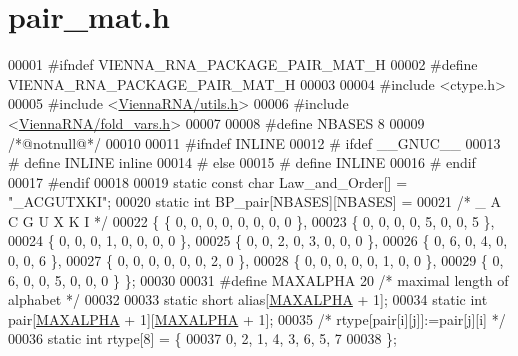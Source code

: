 \hypertarget{pair__mat_8h_source}{}\section{pair\+\_\+mat.\+h}
\label{pair__mat_8h_source}

\begin{DoxyCode}
00001 \textcolor{preprocessor}{#ifndef VIENNA\_RNA\_PACKAGE\_PAIR\_MAT\_H}
00002 \textcolor{preprocessor}{#define VIENNA\_RNA\_PACKAGE\_PAIR\_MAT\_H}
00003 
00004 \textcolor{preprocessor}{#include <ctype.h>}
00005 \textcolor{preprocessor}{#include <\hyperlink{utils_8h}{ViennaRNA/utils.h}>}
00006 \textcolor{preprocessor}{#include <\hyperlink{fold__vars_8h}{ViennaRNA/fold\_vars.h}>}
00007 
00008 \textcolor{preprocessor}{#define NBASES 8}
00009 \textcolor{comment}{/*@notnull@*/}
00010 
00011 \textcolor{preprocessor}{#ifndef INLINE}
00012 \textcolor{preprocessor}{# ifdef \_\_GNUC\_\_}
00013 \textcolor{preprocessor}{#  define INLINE inline}
00014 \textcolor{preprocessor}{# else}
00015 \textcolor{preprocessor}{#  define INLINE}
00016 \textcolor{preprocessor}{# endif}
00017 \textcolor{preprocessor}{#endif}
00018 
00019 \textcolor{keyword}{static} \textcolor{keyword}{const} \textcolor{keywordtype}{char} Law\_and\_Order[]         = \textcolor{stringliteral}{"\_ACGUTXKI"};
00020 \textcolor{keyword}{static} \textcolor{keywordtype}{int}        BP\_pair[NBASES][NBASES] =
00021   \textcolor{comment}{/* \_  A  C  G  U  X  K  I */}
00022 \{ \{ 0, 0, 0, 0, 0, 0, 0, 0 \},
00023   \{ 0, 0, 0, 0, 5, 0, 0, 5 \},
00024   \{ 0, 0, 0, 1, 0, 0, 0, 0 \},
00025   \{ 0, 0, 2, 0, 3, 0, 0, 0 \},
00026   \{ 0, 6, 0, 4, 0, 0, 0, 6 \},
00027   \{ 0, 0, 0, 0, 0, 0, 2, 0 \},
00028   \{ 0, 0, 0, 0, 0, 1, 0, 0 \},
00029   \{ 0, 6, 0, 0, 5, 0, 0, 0 \} \};
00030 
00031 \textcolor{preprocessor}{#define MAXALPHA 20       }\textcolor{comment}{/* maximal length of alphabet */}\textcolor{preprocessor}{}
00032 
00033 \textcolor{keyword}{static} \textcolor{keywordtype}{short}  alias[\hyperlink{group__model__details_ga05a5ffe718aa431d97419a12fb082379}{MAXALPHA} + 1];
00034 \textcolor{keyword}{static} \textcolor{keywordtype}{int}    pair[\hyperlink{group__model__details_ga05a5ffe718aa431d97419a12fb082379}{MAXALPHA} + 1][\hyperlink{group__model__details_ga05a5ffe718aa431d97419a12fb082379}{MAXALPHA} + 1];
00035 \textcolor{comment}{/* rtype[pair[i][j]]:=pair[j][i] */}
00036 \textcolor{keyword}{static} \textcolor{keywordtype}{int}    rtype[8] = \{
00037   0, 2, 1, 4, 3, 6, 5, 7
00038 \};

\end{DoxyCode}
